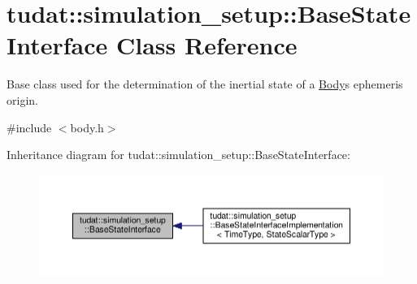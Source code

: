 \hypertarget{classtudat_1_1simulation__setup_1_1BaseStateInterface}{}\section{tudat\+:\+:simulation\+\_\+setup\+:\+:Base\+State\+Interface Class Reference}
\label{classtudat_1_1simulation__setup_1_1BaseStateInterface}


Base class used for the determination of the inertial state of a \hyperlink{classtudat_1_1simulation__setup_1_1Body}{Body}\textquotesingle{}s ephemeris origin.  




{\ttfamily \#include $<$body.\+h$>$}



Inheritance diagram for tudat\+:\+:simulation\+\_\+setup\+:\+:Base\+State\+Interface\+:
\nopagebreak
\begin{figure}[H]
\begin{center}
\leavevmode
\includegraphics[width=350pt]{classtudat_1_1simulation__setup_1_1BaseStateInterface__inherit__graph}
\end{center}
\end{figure}
